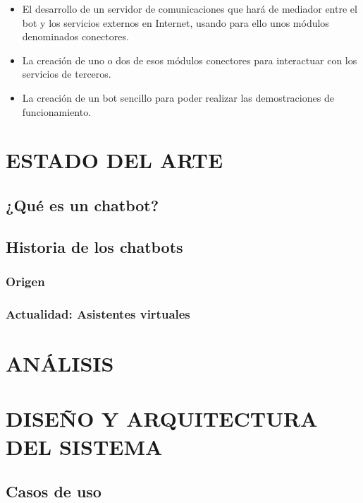 \documentclass[spanish,12pt, a4paper, twoside]{paper}
\let\oldsection\section
\def\section{\cleardoublepage\oldsection}
\begin{document}
\begin{itemize}
\item El desarrollo de un servidor de comunicaciones que hará de mediador entre el bot y los servicios externos en Internet, usando para ello unos módulos denominados conectores.
\item La creación de uno o dos de esos módulos conectores para interactuar con los servicios de terceros.
\item La creación de un bot sencillo para poder realizar las demostraciones de funcionamiento.
\end{itemize}

\section{ESTADO DEL ARTE}

\subsection{¿Qué es un chatbot?}

\subsection{Historia de los chatbots}

\subsubsection{Origen}

\subsubsection{Actualidad: Asistentes virtuales}

\section{ANÁLISIS}



\section{DISEÑO Y ARQUITECTURA DEL SISTEMA}

\subsection{Casos de uso}
\end{document}

